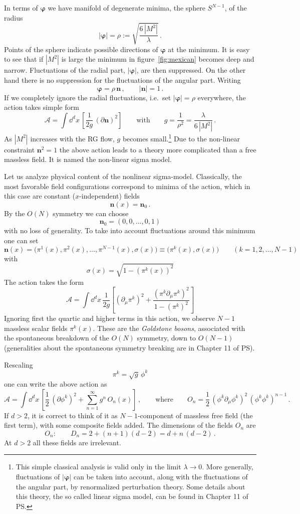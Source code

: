 In terms of $\bm{\varphi}$ we have manifold of degenerate minima, the sphere
$S^{N-1}$, of the radius
\[
|\bm{\varphi}|=\rho:=\sqrt{\frac{6\,|M^2|}\lambda}\,.
\]
Points of the sphere indicate possible directions of $\bm{\varphi}$ at the minimum.
It is easy to see that if $|M^2|$ is large the minimum in figure~\ref{fig:mexican}
becomes deep and narrow. Fluctuations of the radial part, $|\bm{\varphi}|$, are
then suppressed. On the other hand there is no suppression for the fluctuations of
the angular part. Writing
\[
\bm{\varphi}=\rho\,\mathbf n\,,\qquad|\mathbf n|=1\,.
\]
If we completely ignore the radial fluctuations, i.e.\ set $|\bm{\varphi}|=\rho$
everywhere, the action takes simple form
\[
\mathcal A=\int \dd^dx\,\left[\frac1{2g}\,(\partial\mathbf n)^2\right]
\qquad\text{with}\qquad
g=\frac1{\rho^2}=\frac\lambda{6\,|M^2|}\,.
\]
As $|M^2|$ increases with the RG flow, $g$ becomes small.\footnote{This simple
classical analysis is valid only in the limit $\lambda\to0$. More generally,
fluctuations of $|\bm{\varphi}|$ can be taken into account, along with the
fluctuations of the angular part, by renormalized perturbation theory. Some
details about this theory, the so called linear sigma model, can be found in
Chapter 11 of PS.} Due to the non-linear constraint $\mathbf n^2=1$ the above
action leads to a theory more complicated than a free massless field. It is named
the non-linear sigma model.

Let us analyze physical content of the nonlinear sigma-model. Classically, the
most favorable field configurations correspond to minima of the action, which in
this case are constant ($x$-independent) fields
\[
\mathbf n(x)=\mathbf n_0\,.
\]
By the $O(N)$ symmetry we can choose
\[
\mathbf n_0=(0,0,\dots,0,1)
\]
with no loss of generality. To take into account fluctuations around this minimum
one can set
\[
\mathbf n(x)=\bigl(\pi^1(x),\pi^2(x),\dots,\pi^{N-1}(x),\sigma(x)\bigr)\equiv\bigl(\pi^k(x),\sigma(x)\bigr)\qquad(k=1,2,\dots,N-1)
\]
with
\[
\sigma(x)=\sqrt{1-(\pi^k(x))^2}
\]
The action takes the form
\[
\mathcal A=\int \dd^dx\,\frac1{2g}\left[(\partial_\mu\pi^k)^2+\frac{(\pi^k\partial_\mu\pi^k)^2}{1-(\pi^k)^2}\right]
\]
Ignoring first the quartic and higher terms in this action, we observe $N-1$
massless scalar fields $\pi^k(x)$. These are the \emph{Goldstone bosons},
associated with the spontaneous breakdown of the $O(N)$ symmetry, down to
$O(N-1)$ (generalities about the spontaneous symmetry breaking are in Chapter 11
of PS).

Rescaling
\[
\pi^k=\sqrt g\,\phi^k
\]
one can write the above action as
\[
\mathcal A=\int \dd^dx\,\left[\frac12\,(\partial\phi^k)^2+\sum_{n=1}^\infty g^n\,O_n(x)\right]\,,
\qquad\text{where}\qquad
O_n=\frac12\,(\phi^k\partial_\mu\phi^k)^2\,(\phi^k\phi^k)^{n-1}\,.
\]
If $d>2$, it is correct to think of it as $N-1$-component of massless free field
(the first term), with some composite fields added. The dimensions of the fields
$O_n$ are
\[
O_n:\qquad D_n=2+(n+1)(d-2)=d+n\,(d-2)\,.
\]
At $d>2$ all these fields are irrelevant.

